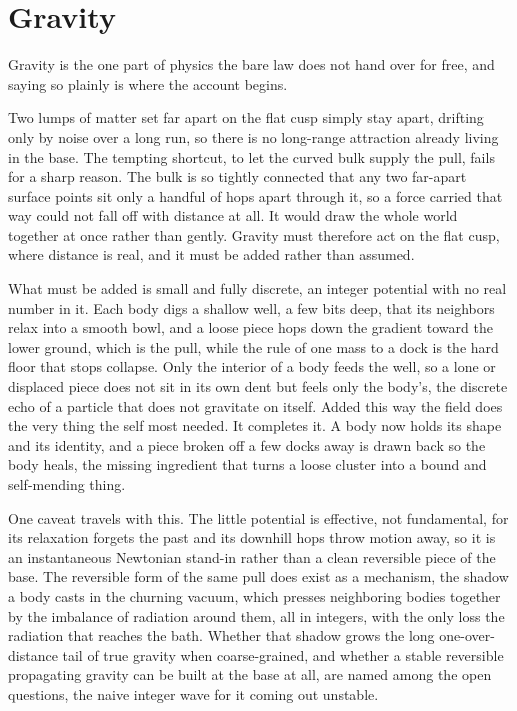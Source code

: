\section{Gravity}

Gravity is the one part of physics the bare law does not hand over for free, and saying so plainly is where the account begins. \cite{pollard2026vibetest}

Two lumps of matter set far apart on the flat cusp simply stay apart, drifting only by noise over a long run, so there is no long-range attraction already living in the base. The tempting shortcut, to let the curved bulk supply the pull, fails for a sharp reason. The bulk is so tightly connected that any two far-apart surface points sit only a handful of hops apart through it, so a force carried that way could not fall off with distance at all. It would draw the whole world together at once rather than gently. Gravity must therefore act on the flat cusp, where distance is real, and it must be added rather than assumed.

What must be added is small and fully discrete, an integer potential with no real number in it. Each body digs a shallow well, a few bits deep, that its neighbors relax into a smooth bowl, and a loose piece hops down the gradient toward the lower ground, which is the pull, while the rule of one mass to a dock is the hard floor that stops collapse. Only the interior of a body feeds the well, so a lone or displaced piece does not sit in its own dent but feels only the body's, the discrete echo of a particle that does not gravitate on itself. Added this way the field does the very thing the self most needed. It completes it. A body now holds its shape and its identity, and a piece broken off a few docks away is drawn back so the body heals, the missing ingredient that turns a loose cluster into a bound and self-mending thing.

One caveat travels with this. The little potential is effective, not fundamental, for its relaxation forgets the past and its downhill hops throw motion away, so it is an instantaneous Newtonian stand-in rather than a clean reversible piece of the base. The reversible form of the same pull does exist as a mechanism, the shadow a body casts in the churning vacuum, which presses neighboring bodies together by the imbalance of radiation around them, all in integers, with the only loss the radiation that reaches the bath. Whether that shadow grows the long one-over-distance tail of true gravity when coarse-grained, and whether a stable reversible propagating gravity can be built at the base at all, are named among the open questions, the naive integer wave for it coming out unstable.

